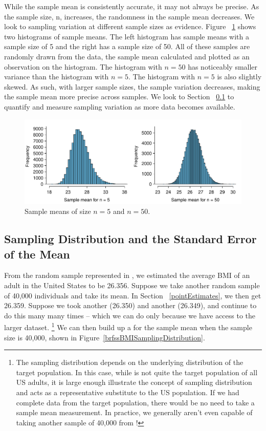 While the sample mean is consistently accurate, it may not always be precise. As the sample size, n, increases, the randomness in the sample mean decreases. We look to sampling variation at different sample sizes as evidence. Figure ~\ref{sampleMeanPrecision} shows two histograms of sample means. The left histogram has sample means with a sample size of 5 and the right has a sample size of 50. All of these samples are randomly drawn from the  data, the sample mean calculated and plotted as an observation on the histogram. The histogram with $n=50$ has noticeably smaller variance than the histogram with $n=5$. The histogram with $n=5$ is also slightly skewed. As such, with larger sample sizes, the sample variation decreases, making the sample mean more precise across samples. We look to Section ~\ref{seOfTheMean} to quantify and measure sampling variation as more data becomes available. 

\begin{figure}
   \centering
   \includegraphics[width=\textwidth]{ch_inference_foundations_oi_biostat/figures/brfssBMISampleMeanPrecision/brfssBMISampleMeanPrecision}
   \caption{Sample means of size $n=5$ and $n=50$.}
   \label{sampleMeanPrecision}
\end{figure}
 
\subsection{Sampling Distribution and the Standard Error of the Mean}
\label{seOfTheMean}

From the random sample represented in , we estimated the average BMI of an adult in the United States to be 26.356. Suppose we take another random sample of 40,000 individuals and take its mean. In Section ~\ref{pointEstimates}, we then get 26.359. Suppose we took another (26.350) and another (26.349), and continue to do this many many times -- which we can do only because we have access to the larger  dataset. \footnote{The sampling distribution depends on the underlying distribution of the target population. In this case, while  is not quite the target population of all US adults, it is large enough illustrate the concept of sampling distribution and acts as a representative substitute to the US population. If we had complete data from the target population, there would be no need to take a sample mean measurement. In practice, we generally aren't even capable of taking another sample of 40,000 from !} We can then build up a  for the sample mean when the sample size is 40,000, shown in Figure~\ref{brfssBMISamplingDistribution}.

